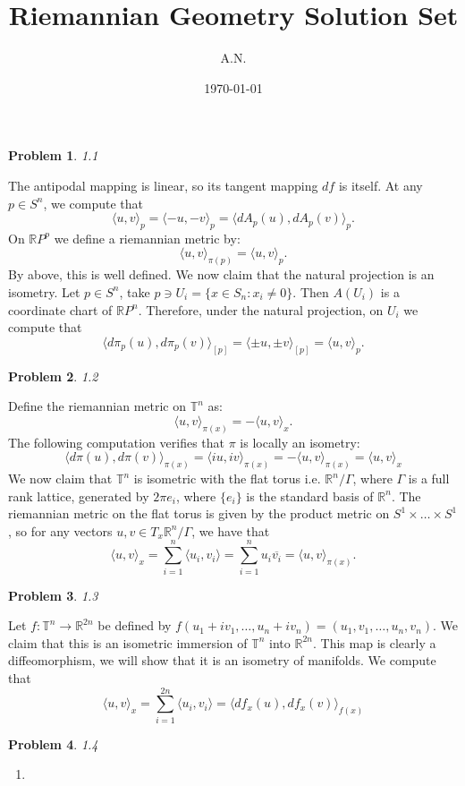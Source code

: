 \documentclass[12pt, a4paper]{article}
\title{Riemannian Geometry Solution Set}
\author{A.N.}
\date{\today}
\newtheorem{problem}{Problem}
\theoremstyle{definition}
\newcommand{\penum}{ \begin{enumerate}[label=\bf(\alph*), leftmargin=0pt]}
\newcommand{\epenum}{ \end{enumerate} }
\newcommand{\R}{\mathbb{R}}                           %
\newcommand{\ol}{\overline}
\newcommand{\lan}{\langle}
\newcommand{\ran}{\rangle}
\newcommand{\inn}[1]{\lan#1\ran}
\begin{document}
	\maketitle
	\newpage
	\begin{problem}
	1.1
	\end{problem}
The antipodal mapping is linear, so its tangent mapping $df$ is itself. At any $p \in S^n$, we compute that $$\inn{u,v}_p  = \inn{-u,-v}_p = \inn{dA_p(u), dA_p(v)}_p. $$
On $\R P^p$ we define a riemannian metric by: $$\inn{u,v}_{\pi(p)} = \inn{u,v}_p. $$ By above, this is well defined. We now claim that the natural projection is an isometry. Let  $p\in S^n$, take $p \ni U_i = \{x\in S_n : x_i \neq 0\}$. Then $A(U_i)$ is a coordinate chart of $\R P^n$. Therefore, under the natural projection, on $U_i$ we compute that $$\inn{d\pi_p(u), d\pi_p(v)}_{[p]} = \inn{\pm u, \pm v}_{[p]} = \inn{u,v}_p. $$
\begin{problem}
	1.2
\end{problem}
Define the riemannian metric on $\mathbb{T}^n$ as: $$\inn{u,v}_{\pi(x)} = - \inn{u,v}_x.$$ The following computation verifies that $\pi$ is locally an isometry:
$$\inn{d\pi(u), d\pi(v)}_{\pi(x)} = \inn{iu, iv}_{\pi(x)} = -\inn{u,v}_{\pi(x)} = \inn{u,v}_x$$
We now claim that $\mathbb{T}^n$ is isometric with the flat torus i.e. $\R^n / \Gamma$, where $\Gamma$ is a
full rank lattice, generated by $2\pi e_i$, where $\{e_i\}$ is the standard basis of $\R^n$. 
The riemannian metric on the flat torus is given by the product metric on $S^1 \times \dots \times S^1$, so for any vectors $u,v \in T_x \R^n / \Gamma$, we have that 
$$\inn{u,v}_x  = \sum_{i=1}^n \inn{u_i,v_i}  = \sum_{i=1}^n u_i\ol{v_i} = \inn{u,v}_{\pi(x)}. $$
\begin{problem}
	1.3
\end{problem}
Let $f: \mathbb{T}^n \to \R^{2n}$ be defined by $f(u_1+ iv_1, \dots , u_n+iv_n)=(u_1,v_1, \dots , u_n,v_n). $ We claim that this is an isometric immersion of $\mathbb{T}^n$ into $\R^{2n}$. This map is clearly a diffeomorphism, we will show that it is an isometry of manifolds. We compute that 
$$\inn{u, v}_x = \sum_{i=1}^{2n} \inn{u_i,v_i} =\inn{df_x(u), df_x(v)  }_{f(x)}  $$
\begin{problem}
	1.4
\end{problem}
\penum
\item 
\epenum
\end{document}
